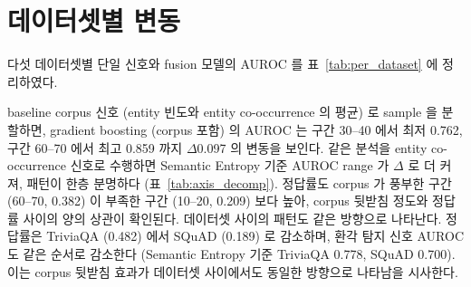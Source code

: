 \documentclass[oneside,ko,under]{snuthesis}
\begin{document}
\section{데이터셋별 변동}\label{sec:per_dataset}

다섯 데이터셋별 단일 신호와 fusion 모델의 AUROC 를 표~\ref{tab:per_dataset} 에 정리하였다.

\begin{table}[htbp]
\centering
\small
\caption[데이터셋별 AUROC]{데이터셋별 AUROC. sample 단위 5-fold 교차검증의 검증 fold 예측을 기준으로 산출하였다. 정답률은 데이터셋 평균이다.}
\label{tab:per_dataset}
\end{table}

baseline corpus 신호 (entity 빈도와 entity co-occurrence 의 평균) 로 sample 을 분할하면, gradient boosting (corpus 포함) 의 AUROC 는 구간 30--40 에서 최저 0.762, 구간 60--70 에서 최고 0.859 까지 $\Delta$0.097 의 변동을 보인다. 같은 분석을 entity co-occurrence 신호로 수행하면 Semantic Entropy 기준 AUROC range 가 $\Delta$\HeadlineEntityPairSEDelta{} 로 더 커져, 패턴이 한층 분명하다 (표~\ref{tab:axis_decomp}). 정답률도 corpus 가 풍부한 구간 (60--70, 0.382) 이 부족한 구간 (10--20, 0.209) 보다 높아, corpus 뒷받침 정도와 정답률 사이의 양의 상관이 확인된다. 데이터셋 사이의 패턴도 같은 방향으로 나타난다. 정답률은 TriviaQA (0.482) 에서 SQuAD (0.189) 로 감소하며, 환각 탐지 신호 AUROC 도 같은 순서로 감소한다 (Semantic Entropy 기준 TriviaQA 0.778, SQuAD 0.700). 이는 corpus 뒷받침 효과가 데이터셋 사이에서도 동일한 방향으로 나타남을 시사한다.
\end{document}
